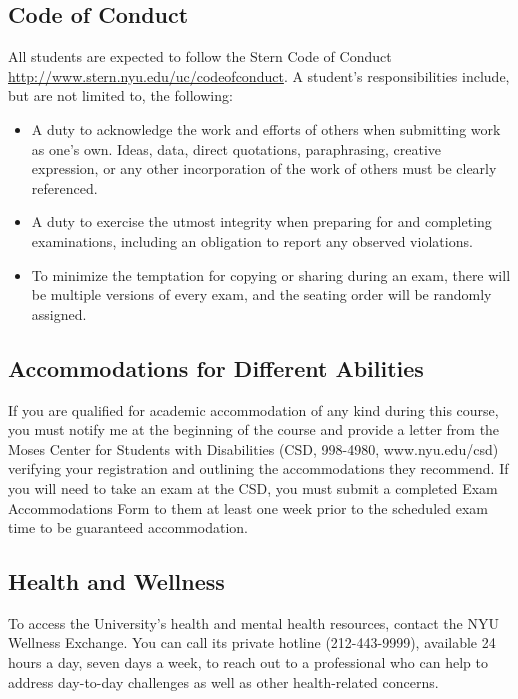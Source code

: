 \documentclass[11pt]{article}
\begin{document}
\subsection*{Code of Conduct}

All students are expected to follow the Stern Code of Conduct \url{http://www.stern.nyu.edu/uc/codeofconduct}. A student's responsibilities include, but are not limited to, the following:
\begin{itemize}
\item A duty to acknowledge the work and efforts of others when submitting work as one's own.
Ideas, data, direct quotations, paraphrasing, creative expression, or any other incorporation
of the work of others must be clearly referenced.
\item A duty to exercise the utmost integrity when preparing for and completing examinations, including an obligation to report any observed violations.
\item To minimize the temptation for copying or sharing during an exam, there will be multiple versions of every exam, and the seating order will be randomly assigned.
\end{itemize}

\subsection*{Accommodations for Different Abilities}
If you are qualified for academic accommodation of any kind during this course, you must notify me at the beginning of the course and provide a letter from the Moses Center for Students with Disabilities (CSD, 998-4980, www.nyu.edu/csd) verifying your registration and outlining the accommodations they recommend.  If you will need to take an exam at the CSD, you must submit a completed Exam Accommodations Form to them at least one week prior to the scheduled exam time to be guaranteed accommodation.

\subsection*{Health and Wellness}
To access the University's health and mental health resources, contact the NYU Wellness Exchange.
You can call its private hotline (212-443-9999), available 24 hours a day, seven days a week, to reach out to a
professional who can help to address day-to-day challenges as well as other health-related concerns.
\end{document}
